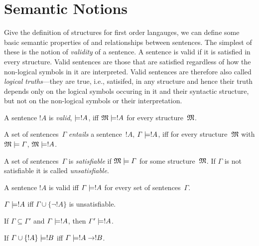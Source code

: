 \documentclass[syntax-and-semantics]{subfiles}
\begin{document}
\section{Semantic Notions}

\begin{wordy}
Give the definition of structures for first order langauges, we can
define some basic semantic properties of and relationships between
sentences.  The simplest of these is the notion of \emph{validity} of
a sentence.  A sentence is valid if it is satisfied in every
structure.  Valid sentences are those that are satisfied regardless of
how the non-logical symbols in it are interpreted.  Valid sentences
are therefore also called \emph{logical truths}---they are true, i.e.,
satisifed, in any structure and hence their truth depends only on the
logical symbols occuring in it and their syntactic structure, but not
on the non-logical symbols or their interpretation.  
\end{wordy}

\begin{defn}[Validity]
A sentence $!A$ is \emph{valid}, $\Entails !A$, iff $\Sat{M}{!A}$ for every
structure~$\mathfrak M$.
\end{defn}

\begin{defn}[Entailment]
A set of sentences~$\Gamma$ \emph{entails} a sentence~$!A$, $\Gamma
\Entails !A$, iff for every structure~$\mathfrak M$ with
$\Sat{M}{\Gamma}$, $\Sat{M}{!A}$.
\end{defn}

\begin{defn}[Satisfiability]
A set of sentences~$\Gamma$ is \emph{satisfiable} if $\Sat{M}{\Gamma}$
for some structure~$\mathfrak M$.  If $\Gamma$ is not satisfiable it is
called \emph{unsatisfiable}.
\end{defn}

\begin{prop}
A sentence $!A$ is valid iff $\Gamma \Entails !A$ for every set of
sentences~$\Gamma$.
\end{prop}


\begin{prop}
$\Gamma \Entails !A$ iff $\Gamma \cup \{\lnot !A\}$ is unsatisfiable.
\end{prop}


\begin{prop}
If $\Gamma \subseteq \Gamma'$ and $\Gamma \Entails !A$, then $\Gamma'
\Entails !A$.
\end{prop}


\begin{thm}
If $\Gamma \cup \{!A\} \Entails !B$ iff $\Gamma \Entails !A \lif !B$.
\end{thm}

\end{document}
